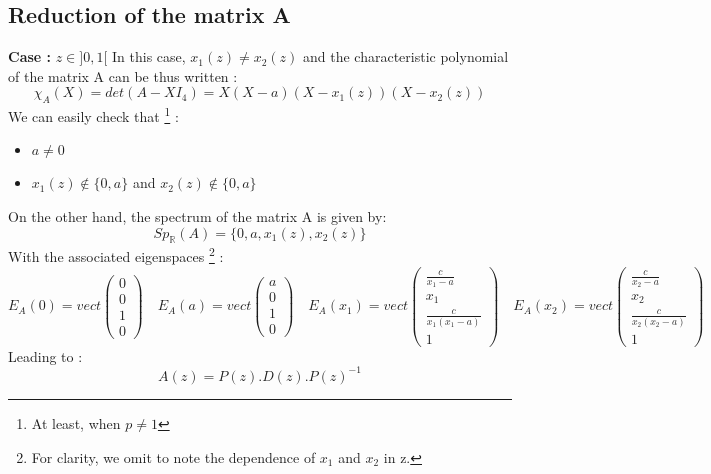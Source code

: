 \documentclass{article}
\begin{document}
\subsection{Reduction of the matrix A}
\begin{flushleft}
\textbf{Case :}  $z \in ]0,1[$ 
\medbreak
In this case,  $ x_{1}(z) \ne x_{2}(z) $ and the characteristic polynomial of the matrix A can be thus written :
\begin{equation}
\chi_{A}(X) = det(A-XI_{4}) = X(X-a)(X-x_{1}(z))(X-x_{2}(z))
\end{equation}
We can easily check that \footnote{At least, when $ p \ne 1 $} :
\begin{itemize}
\item $a \ne 0$
\item $x_{1}(z) \notin \{0,a\}$ and $x_{2}(z) \notin \{0,a\}$
\end{itemize}

On the other hand, the spectrum of the matrix A is given by: 
\begin{equation}
Sp_{\mathbb{R}}(A) =\{0,a,x_{1}(z),x_{2}(z)\}
\end{equation}
With the associated eigenspaces \footnote{For clarity, we omit to note the dependence of $x_{1}$ and $x_{2}$ in z.} :
$$
 E_{A}(0) = vect
 \begin{pmatrix}
 0\\
 0\\
 1\\
 0
 \end{pmatrix}
 \quad
 E_{A}(a) = vect
 \begin{pmatrix} 
 a\\
 0\\
 1\\
 0
 \end{pmatrix}
 \quad
 E_{A}(x_{1}) = vect
 \begin{pmatrix} 
 \frac{c}{x_{1}-a}\\
 x_{1}\\
 \frac{c}{x_{1}(x_{1}-a)}\\
 1
 \end{pmatrix}
 \quad
 E_{A}(x_{2}) = vect
 \begin{pmatrix} 
 \frac{c}{x_{2}-a}\\
 x_{2}\\
 \frac{c}{x_{2}(x_{2}-a)}\\
 1
 \end{pmatrix}
$$
Leading to :
\begin{equation}
A(z) = P(z).D(z).P(z)^{-1}
\end{equation}


\end{flushleft}
\end{document}
